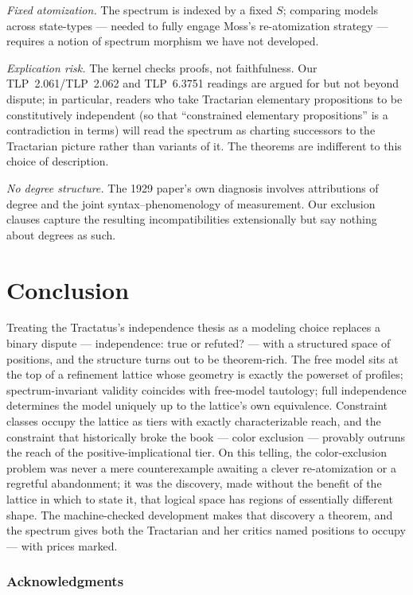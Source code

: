 \documentclass[10pt, letterpaper]{article}
\theoremstyle{remark}
\newcommand{\TLP}[1]{TLP~#1}
\begin{document}
\emph{Fixed atomization.} The spectrum is indexed by a fixed $S$; comparing
models across state-types --- needed to fully engage Moss's re-atomization
strategy --- requires a notion of spectrum morphism we have not developed.

\emph{Explication risk.} The kernel checks proofs, not faithfulness. Our
\TLP{2.061}/\TLP{2.062} and \TLP{6.3751} readings are argued for but not
beyond dispute; in particular, readers who take Tractarian elementary
propositions to be constitutively independent (so that ``constrained
elementary propositions'' is a contradiction in terms) will read the spectrum
as charting successors to the Tractarian picture rather than variants of it.
The theorems are indifferent to this choice of description.

\emph{No degree structure.} The 1929 paper's own diagnosis involves
attributions of degree and the joint syntax--phenomenology of measurement.
Our exclusion clauses capture the resulting incompatibilities extensionally
but say nothing about degrees as such.

\section{Conclusion}\label{sec:conclusion}

Treating the Tractatus's independence thesis as a modeling choice replaces a
binary dispute --- independence: true or refuted? --- with a structured
space of positions, and the structure turns out to be theorem-rich. The free
model sits at the top of a refinement lattice whose geometry is exactly the
powerset of profiles; spectrum-invariant validity coincides with free-model
tautology; full independence determines the model uniquely up to the
lattice's own equivalence. Constraint classes occupy the lattice as tiers
with exactly characterizable reach, and the constraint that historically
broke the book --- color exclusion --- provably outruns the reach of the
positive-implicational tier. On this telling, the color-exclusion problem
was never a mere counterexample awaiting a clever re-atomization or a
regretful abandonment; it was the discovery, made without the benefit of the
lattice in which to state it, that logical space has regions of essentially
different shape. The machine-checked development makes that discovery a
theorem, and the spectrum gives both the Tractarian and her critics named
positions to occupy --- with prices marked.

\subsubsection*{Acknowledgments}
\end{document}
